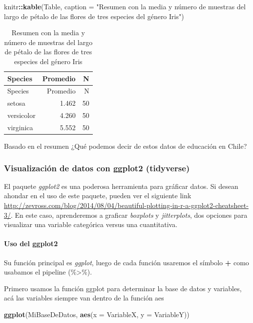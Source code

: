 \documentclass[]{article}
\newenvironment{Shaded}{\begin{snugshade}}{\end{snugshade}}
\newcommand{\KeywordTok}[1]{\textcolor[rgb]{0.13,0.29,0.53}{\textbf{#1}}}
\newcommand{\DataTypeTok}[1]{\textcolor[rgb]{0.13,0.29,0.53}{#1}}
\newcommand{\StringTok}[1]{\textcolor[rgb]{0.31,0.60,0.02}{#1}}
\newcommand{\OperatorTok}[1]{\textcolor[rgb]{0.81,0.36,0.00}{\textbf{#1}}}
\newcommand{\NormalTok}[1]{#1}
\let\oldparagraph\paragraph
\renewcommand{\paragraph}[1]{\oldparagraph{#1}\mbox{}}
\begin{document}
\begin{Shaded}
\begin{Highlighting}[]
\NormalTok{knitr}\OperatorTok{::}\KeywordTok{kable}\NormalTok{(Table, }\DataTypeTok{caption =} \StringTok{"Resumen con la media y número de muestras del largo de pétalo de las flores de tres especies del género Iris"}\NormalTok{)}
\end{Highlighting}
\end{Shaded}

\begin{longtable}[]{@{}lrr@{}}
\caption{Resumen con la media y número de muestras del largo de pétalo
de las flores de tres especies del género Iris}\tabularnewline
\toprule
Species & Promedio & N\tabularnewline
\midrule
\endfirsthead
\toprule
Species & Promedio & N\tabularnewline
\midrule
\endhead
setosa & 1.462 & 50\tabularnewline
versicolor & 4.260 & 50\tabularnewline
virginica & 5.552 & 50\tabularnewline
\bottomrule
\end{longtable}

Basado en el resumen ¿Qué podemos decir de estos datos de educación en
Chile?

\subsubsection{Visualización de datos con ggplot2
(tidyverse)}\label{visualizacion-de-datos-con-ggplot2-tidyverse}

El paquete \emph{ggplot2} es una poderosa herramienta para gráficar
datos. Si desean ahondar en el uso de este paquete, pueden ver el
siguiente link
\url{http://zevross.com/blog/2014/08/04/beautiful-plotting-in-r-a-ggplot2-cheatsheet-3/}.
En este caso, aprenderemos a graficar \emph{boxplots} y
\emph{jitterplots}, dos opciones para visualizar una variable categórica
versus una cuantitativa.

\paragraph{Uso del ggplot2}\label{uso-del-ggplot2}

Su función principal es \emph{ggplot}, luego de cada función usaremos el
símbolo \textbf{+} como usabamos el pipeline (\%\textgreater{}\%).

Primero usamos la función ggplot para determinar la base de datos y
variables, acá las variables siempre van dentro de la función aes

\begin{Shaded}
\begin{Highlighting}[]
\KeywordTok{ggplot}\NormalTok{(MiBaseDeDatos, }\KeywordTok{aes}\NormalTok{(}\DataTypeTok{x =}\NormalTok{ VariableX, }\DataTypeTok{y =}\NormalTok{ VariableY)) }
\end{Highlighting}
\end{Shaded}
\end{document}
